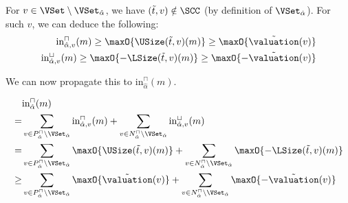 For $v \in \VSet \setminus \VSet_{\hat{\alpha}}$, we have $(\tilde{t}, v) \notin \SCC$ (by definition of $\VSet_{\hat{\alpha}}$).
For such $v$, we can deduce the following:
\begin{equation} \label{eq:input_rv_var_reduction}
  \begin{split}
    \text{in}^\sqcap_{\hat{\alpha},v}(m) \geq \maxO{\USize(\tilde{t}, v)(m)} \geq \maxO{\tilde{\valuation}(v)} \\
    \text{in}^\sqcup_{\hat{\alpha},v}(m) \geq \maxO{-\LSize(\tilde{t}, v)(m)} \geq \maxO{-\tilde{\valuation}(v)}
  \end{split}
\end{equation}


We can now propagate this to $\text{in}^\sqcap_{\hat{\alpha}}(m)$.

\begin{equation} \label{eq:input_rv_reduction}
  \begin{split}
  & \text{in}^\sqcap_{\hat{\alpha}}(m) \\
  = & \sum_{v \in P_{\hat{\alpha}}^\sqcap \setminus \VSet_{\hat{\alpha}}} \text{in}^\sqcap_{{\hat{\alpha}},v}(m)
    + \sum_{v \in N_{\hat{\alpha}}^\sqcap \setminus \VSet_{\hat{\alpha}}} \text{in}^\sqcup_{{\hat{\alpha}},v}(m) \\
  = & \sum_{v \in P_{\hat{\alpha}}^\sqcap \setminus \VSet_{\hat{\alpha}}} \maxO{\USize(\tilde{t}, v)(m)}
    + \sum_{v \in N_{\hat{\alpha}}^\sqcap \setminus \VSet_{\hat{\alpha}}} \maxO{-\LSize(\tilde{t}, v)(m)} \\
  \geq & \sum_{v \in P_{\hat{\alpha}}^\sqcap \setminus \VSet_{\hat{\alpha}}} \maxO{\tilde{\valuation}(v)}
    + \sum_{v \in N_{\hat{\alpha}}^\sqcap \setminus \VSet_{\hat{\alpha}}} \maxO{-\tilde{\valuation}(v)} \\
  \end{split}
\end{equation}

